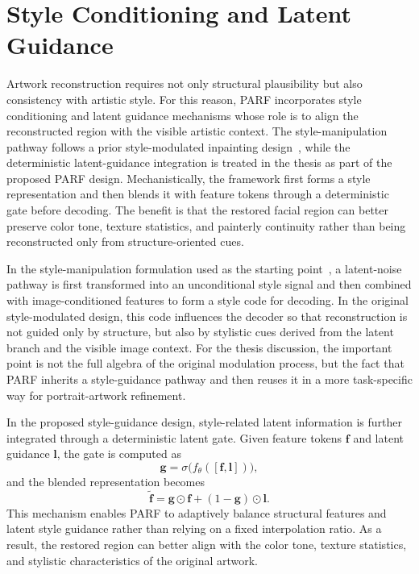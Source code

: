 \documentclass[12pt, twoside]{report}
\begin{document}
\section{Style Conditioning and Latent Guidance}

Artwork reconstruction requires not only structural plausibility but also consistency with artistic style. For this reason, PARF incorporates style conditioning and latent guidance mechanisms whose role is to align the reconstructed region with the visible artistic context. The style-manipulation pathway follows a prior style-modulated inpainting design~\cite{li2022mat}, while the deterministic latent-guidance integration is treated in the thesis as part of the proposed PARF design. Mechanistically, the framework first forms a style representation and then blends it with feature tokens through a deterministic gate before decoding. The benefit is that the restored facial region can better preserve color tone, texture statistics, and painterly continuity rather than being reconstructed only from structure-oriented cues.

In the style-manipulation formulation used as the starting point~\cite{li2022mat}, a latent-noise pathway is first transformed into an unconditional style signal and then combined with image-conditioned features to form a style code for decoding. In the original style-modulated design, this code influences the decoder so that reconstruction is not guided only by structure, but also by stylistic cues derived from the latent branch and the visible image context. For the thesis discussion, the important point is not the full algebra of the original modulation process, but the fact that PARF inherits a style-guidance pathway and then reuses it in a more task-specific way for portrait-artwork refinement.

In the proposed style-guidance design, style-related latent information is further integrated through a deterministic latent gate. Given feature tokens $\mathbf{f}$ and latent guidance $\mathbf{l}$, the gate is computed as
\begin{equation}
\mathbf{g} = \sigma\big(f_{\theta}([\mathbf{f}, \mathbf{l}])\big),
\end{equation}
and the blended representation becomes
\begin{equation}
\tilde{\mathbf{f}} = \mathbf{g} \odot \mathbf{f} + (1-\mathbf{g}) \odot \mathbf{l}.
\end{equation}
This mechanism enables PARF to adaptively balance structural features and latent style guidance rather than relying on a fixed interpolation ratio. As a result, the restored region can better align with the color tone, texture statistics, and stylistic characteristics of the original artwork.
\end{document}
